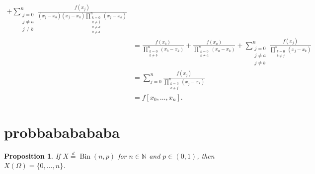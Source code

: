 \documentclass[12pt]{article}
\newtheorem{proposition}{Proposition}
\newcommand{\N}{\mathbb{N}}
\begin{document}
\begin{align*}
        +\sum_{\substack{j=0 \\ j\ne a \\ j\ne b}}^n \frac{f(x_j)}{(x_j-x_b)(x_j-x_a)\displaystyle\prod_{\substack{k=0 \\ k\ne j \\ k\ne a \\ k\ne b}}^n (x_j-x_k)} \\
    &= \frac{f(x_b)}{\displaystyle\prod_{\substack{k=0 \\ k\ne b}}^n (x_b-x_k)}
        + \frac{f(x_a)}{\displaystyle\prod_{\substack{k=0 \\ k\ne a}}^n (x_a-x_k)}
        +\sum_{\substack{j=0 \\ j\ne a \\ j\ne b}}^n \frac{f(x_j)}{\displaystyle\prod_{\substack{k=0 \\ k\ne j}}^n (x_j-x_k)} \\
    &= \sum_{j=0}^n \frac{f(x_j)}{\displaystyle\prod_{\substack{k=0 \\ k\ne j}}^n (x_j-x_k)} \\
    &= f[x_0,\dots,x_n].
\end{align*}

\section{probbababababa}

\begin{proposition}
    If $X \overset{d}{=} \operatorname{Bin}(n, p)$ for $n\in\N$ and $p\in(0, 1)$, then $X(\Omega) = \{0, \dots, n\}$.
\end{proposition}
\end{document}
